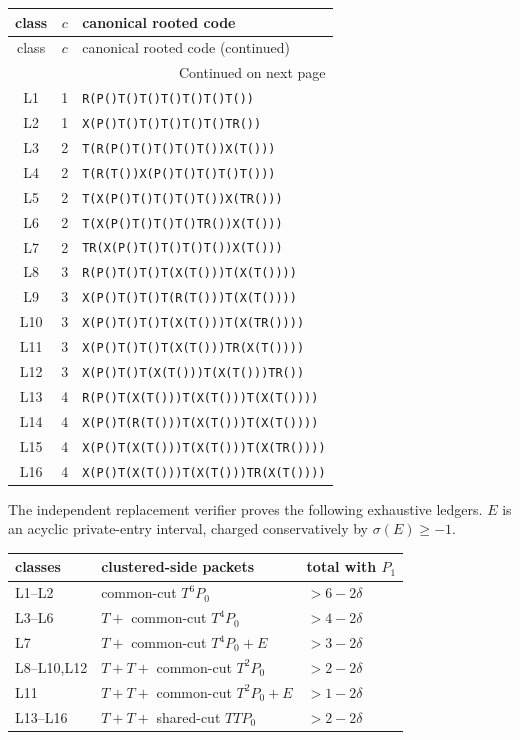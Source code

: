 \documentclass[11pt]{article}
\newcommand{\sig}{\sigma}
\begin{document}
\begin{center}
\small
\begin{longtable}{ccl}
\toprule
class&$c$&canonical rooted code\\
\midrule
\endfirsthead
\toprule
class&$c$&canonical rooted code (continued)\\
\midrule
\endhead
\midrule
\multicolumn{3}{r}{Continued on next page}\\
\endfoot
\bottomrule
\endlastfoot
L1&1&\texttt{R(P()T()T()T()T()T()T())}\\
L2&1&\texttt{X(P()T()T()T()T()T()TR())}\\
L3&2&\texttt{T(R(P()T()T()T()T())X(T()))}\\
L4&2&\texttt{T(R(T())X(P()T()T()T()T()))}\\
L5&2&\texttt{T(X(P()T()T()T()T())X(TR()))}\\
L6&2&\texttt{T(X(P()T()T()T()TR())X(T()))}\\
L7&2&\texttt{TR(X(P()T()T()T()T())X(T()))}\\
L8&3&\texttt{R(P()T()T()T(X(T()))T(X(T())))}\\
L9&3&\texttt{X(P()T()T()T(R(T()))T(X(T())))}\\
L10&3&\texttt{X(P()T()T()T(X(T()))T(X(TR())))}\\
L11&3&\texttt{X(P()T()T()T(X(T()))TR(X(T())))}\\
L12&3&\texttt{X(P()T()T(X(T()))T(X(T()))TR())}\\
L13&4&\texttt{R(P()T(X(T()))T(X(T()))T(X(T())))}\\
L14&4&\texttt{X(P()T(R(T()))T(X(T()))T(X(T())))}\\
L15&4&\texttt{X(P()T(X(T()))T(X(T()))T(X(TR())))}\\
L16&4&\texttt{X(P()T(X(T()))T(X(T()))TR(X(T())))}\\
\end{longtable}
\end{center}
The independent replacement verifier proves the following exhaustive ledgers.
$E$ is an acyclic private-entry interval, charged conservatively by
$\sig(E)\geq-1$.
\begin{center}
\begin{tabular}{lll}
\toprule
classes & clustered-side packets & total with $P_1$\\
\midrule
L1--L2 & common-cut $T^6P_0$ &$>6-2\delta$\\
L3--L6 & $T+$ common-cut $T^4P_0$ &$>4-2\delta$\\
L7 & $T+$ common-cut $T^4P_0+E$ &$>3-2\delta$\\
L8--L10,L12 & $T+T+$ common-cut $T^2P_0$ &$>2-2\delta$\\
L11 & $T+T+$ common-cut $T^2P_0+E$ &$>1-2\delta$\\
L13--L16 & $T+T+$ shared-cut $TTP_0$ &$>2-2\delta$\\
\bottomrule
\end{tabular}
\end{center}
\end{document}
